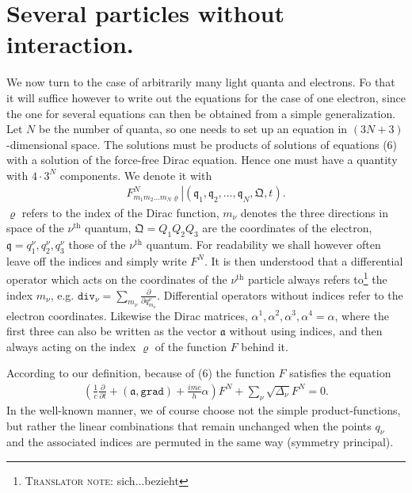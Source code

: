 \documentclass[a4paper,11pt]{article}
\newcommand{\?}[2]{#1\footnote{\textsc{Translator note}: #2}}
\newcommand{\nequ}[2]{\begin{align*}\tag{#1}#2\end{align*}}
\renewcommand{\operatorfont}[1]{\texttt{#1}}
\newcommand{\grad}{\operatorfont{grad}}
\renewcommand{\div}{\operatorfont{div}}
\newcommand{\pXpY}[2]{\frac{\partial #1}{\partial #2}}
\newcommand{\mf}[1]{\mathfrak{#1}}
\newcommand{\Nth}[1]{{#1}^\text{th}}
\begin{document}
\section{Several particles without interaction.} We now turn to the case of arbitrarily many light quanta and electrons. Fo that it will suffice however to write out the equations for the case of one electron, since the one for several equations can then be obtained from a simple generalization. Let $N$ be the number of quanta, so one needs to set up an equation in $(3N+3)$-dimensional space. The solutions must be products of solutions of equations (6) with a solution of the force-free Dirac equation. Hence one must have a quantity with $4\cdot 3^N$ components. We denote it with 
\nequ{11}{
\left. F^N_{m_1 m_2 \dots m_N \varrho}\right|(\mf{q}_1, \mf{q}_2, \dots, \mf{q}_N, \mf{Q}, t).
}
$\varrho$ refers to the index of the Dirac function, $m_\nu$ denotes the three directions in space of the $\nu^\text{th}$ quantum, $\mf{Q}=Q_1 Q_2 Q_3$ are the coordinates of the electron, $\mf{q} = q_1^\nu, q_2^\nu, q_3^\nu$ those of the $\nu^\text{th}$ quantum. For readability we shall however often leave off the indices and simply write $F^N$. It is then understood that a differential operator which acts on the coordinates of the $\Nth{\nu}$ particle always \?{refers to}{sich...bezieht} the index $m_\nu$, e.g. $\div_\nu = \sum\limits_{m_\nu}\pXpY{}{q_{m_\nu}^\nu}$. Differential operators without indices refer to the electron coordinates. Likewise the Dirac matrices, $\alpha^1, \alpha^2, \alpha^3, \alpha^4 = \alpha$, where the first three can also be written as the vector $\mf{a}$ without using indices, and then always acting on the index $\varrho$ of the function $F$ behind it.

According to our definition, because of (6) the function $F$ satisfies the equation
\nequ{12}{
\left(\frac{1}{c}\pXpY{}{t} + (\mf{a}, \grad) + \frac{imc}{h}\alpha\right)F^N + \sum\limits_\nu\sqrt{\Delta_\nu} F^N = 0.
}
In the well-known manner, we of course choose not the simple product-functions, but rather the linear combinations that remain unchanged when the points $q_\nu$ and the associated indices are permuted in the same way (symmetry principal).
\end{document}
